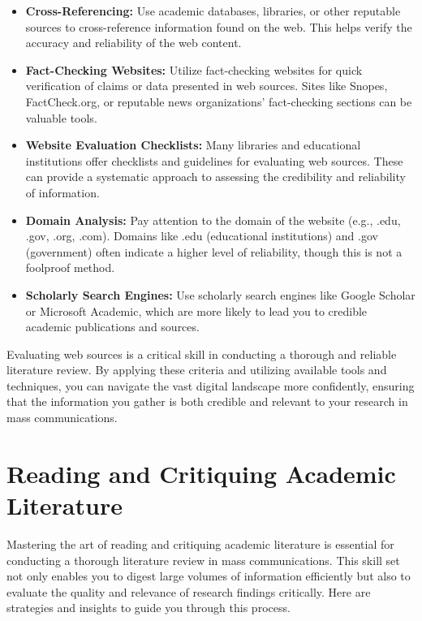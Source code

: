 \documentclass[
]{book}
\begin{document}
\begin{itemize}
\item
  \textbf{Cross-Referencing:} Use academic databases, libraries, or other reputable sources to cross-reference information found on the web. This helps verify the accuracy and reliability of the web content.
\item
  \textbf{Fact-Checking Websites:} Utilize fact-checking websites for quick verification of claims or data presented in web sources. Sites like Snopes, FactCheck.org, or reputable news organizations' fact-checking sections can be valuable tools.
\item
  \textbf{Website Evaluation Checklists:} Many libraries and educational institutions offer checklists and guidelines for evaluating web sources. These can provide a systematic approach to assessing the credibility and reliability of information.
\item
  \textbf{Domain Analysis:} Pay attention to the domain of the website (e.g., .edu, .gov, .org, .com). Domains like .edu (educational institutions) and .gov (government) often indicate a higher level of reliability, though this is not a foolproof method.
\item
  \textbf{Scholarly Search Engines:} Use scholarly search engines like Google Scholar or Microsoft Academic, which are more likely to lead you to credible academic publications and sources.
\end{itemize}

Evaluating web sources is a critical skill in conducting a thorough and reliable literature review. By applying these criteria and utilizing available tools and techniques, you can navigate the vast digital landscape more confidently, ensuring that the information you gather is both credible and relevant to your research in mass communications.

\hypertarget{reading-and-critiquing-academic-literature}{%
\section{Reading and Critiquing Academic Literature}\label{reading-and-critiquing-academic-literature}}

Mastering the art of reading and critiquing academic literature is essential for conducting a thorough literature review in mass communications. This skill set not only enables you to digest large volumes of information efficiently but also to evaluate the quality and relevance of research findings critically. Here are strategies and insights to guide you through this process.
\end{document}
